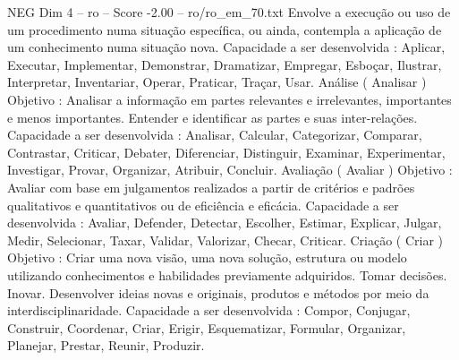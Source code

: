 \begin{textsample}{NEG Dim 4 – ro – Score -2.00 – ro/ro\_em\_70.txt}
Envolve a execução ou uso de um procedimento numa situação específica, ou ainda, contempla a aplicação de um conhecimento numa situação nova.
Capacidade a ser desenvolvida : Aplicar, Executar, Implementar, Demonstrar, Dramatizar, Empregar, Esboçar, Ilustrar, Interpretar, Inventariar, Operar, Praticar, Traçar, Usar.
Análise ( Analisar ) Objetivo : Analisar a informação em partes relevantes e irrelevantes, importantes e menos importantes.
Entender e identificar as partes e suas inter-relações.
Capacidade a ser desenvolvida : Analisar, Calcular, Categorizar, Comparar, Contrastar, Criticar, Debater, Diferenciar, Distinguir, Examinar, Experimentar, Investigar, Provar, Organizar, Atribuir, Concluir.
Avaliação ( Avaliar ) Objetivo : Avaliar com base em julgamentos realizados a partir de critérios e padrões qualitativos e quantitativos ou de eficiência e eficácia.
Capacidade a ser desenvolvida : Avaliar, Defender, Detectar, Escolher, Estimar, Explicar, Julgar, Medir, Selecionar, Taxar, Validar, Valorizar, Checar, Criticar.
Criação ( Criar ) Objetivo : Criar uma nova visão, uma nova solução, estrutura ou modelo utilizando conhecimentos e habilidades previamente adquiridos.
Tomar decisões.
Inovar.
Desenvolver ideias novas e originais, produtos e métodos por meio da interdisciplinaridade.
Capacidade a ser desenvolvida : Compor, Conjugar, Construir, Coordenar, Criar, Erigir, Esquematizar, Formular, Organizar, Planejar, Prestar, Reunir, Produzir.

\end{textsample}
